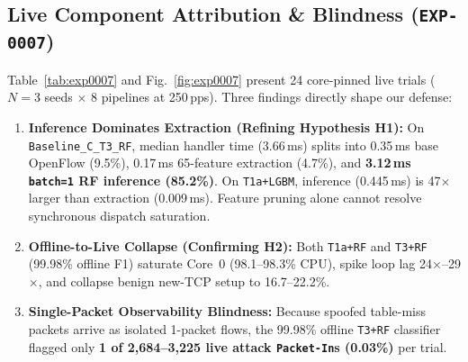 \documentclass[conference]{IEEEtran}
\begin{document}
\subsection{Live Component Attribution \& Blindness (\texttt{EXP-0007})}
Table~\ref{tab:exp0007} and Fig.~\ref{fig:exp0007} present 24 core-pinned live trials ($N=3$ seeds $\times$ 8 pipelines at 250\,pps). Three findings directly shape our defense:
\begin{enumerate}
    \item \textbf{Inference Dominates Extraction (Refining Hypothesis H1):} On \texttt{Baseline\_C\_T3\_RF}, median handler time (3.66\,ms) splits into 0.35\,ms base OpenFlow (9.5\%), 0.17\,ms 65-feature extraction (4.7\%), and \textbf{3.12\,ms \texttt{batch=1} RF inference (85.2\%)}. On \texttt{T1a+LGBM}, inference (0.445\,ms) is 47$\times$ larger than extraction (0.009\,ms). Feature pruning alone cannot resolve synchronous dispatch saturation.
    \item \textbf{Offline-to-Live Collapse (Confirming H2):} Both \texttt{T1a+RF} and \texttt{T3+RF} (99.98\% offline F1) saturate Core~0 (98.1--98.3\% CPU), spike loop lag 24$\times$--29$\times$, and collapse benign new-TCP setup to 16.7--22.2\%.
    \item \textbf{Single-Packet Observability Blindness:} Because spoofed table-miss packets arrive as isolated 1-packet flows, the 99.98\% offline \texttt{T3+RF} classifier flagged only \textbf{1 of 2,684--3,225 live attack \texttt{Packet-In}s (0.03\%)} per trial.
\end{enumerate}

\begin{table}[t]
\centering
\caption{\texttt{EXP-0007} Live Component Attribution Inside Core-Pinned \texttt{os-ken} (250\,pps, $N=3$ Seeds)}
\label{tab:exp0007}
\end{table}
\end{document}
